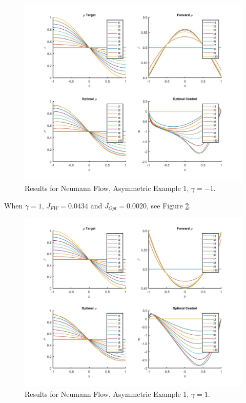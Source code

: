 \documentclass[11pt, a4paper]{article}
\theoremstyle{definition}
\begin{document}
\begin{figure}[h]
	\includegraphics[scale=0.3]{Resn13.jpg}
	\caption{Results for Neumann Flow, Asymmetric Example 1, $\gamma = -1$.}
	\label{Resn13}
\end{figure}
When $\gamma = 1$, $J_{FW} = 0.0434$ and $J_{Opt} = 0.0020$, see Figure \ref{Res13}.
\begin{figure}[h]
	\includegraphics[scale=0.3]{Res13.jpg}
	\caption{Results for Neumann Flow, Asymmetric Example 1, $\gamma = 1$.}
	\label{Res13}
\end{figure}
\end{document}
